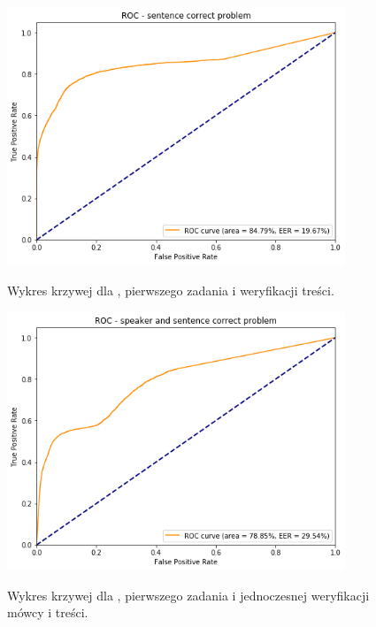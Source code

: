 \begin{figure}[H]
    \centering
    \begin{minipage}{.5\textwidth}
        \centering
        \includegraphics[width=0.9\textwidth]{images/4_3_dnn_roc_sentence}
        \caption{Wykres krzywej  dla , pierwszego zadania  i weryfikacji treści.}
        \label{fig:4_3_dnn_roc_sentence}
    \end{minipage}%
    \begin{minipage}{.5\textwidth}
        \centering
        \includegraphics[width=0.9\textwidth]{images/4_3_dnn_roc_both}
        \caption{Wykres krzywej  dla , pierwszego zadania  i jednoczesnej weryfikacji mówcy i treści.}
        \label{fig:4_3_gmm_roc_both}
        \label{fig:4_3_dnn_roc_both}
    \end{minipage}
\end{figure}

